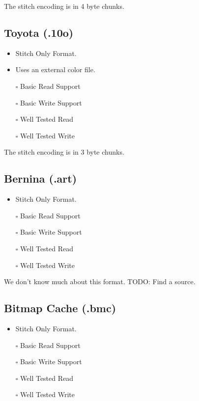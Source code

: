 \documentclass[onesize, a4paper]{refart}
\providecommand{\tightlist}{\setlength{\itemsep}{0pt}\setlength{\parskip}{0pt}}
\begin{document}
The stitch encoding is in 4 byte chunks.

\subsection{Toyota (.10o)}

\begin{itemize}
\tightlist
\item Stitch Only Format.
\item Uses an external color file.
\item[$\square$] Basic Read Support
\item[$\square$] Basic Write Support
\item[$\square$] Well Tested Read
\item[$\square$] Well Tested Write
\end{itemize}

The stitch encoding is in 3 byte chunks.

\subsection{Bernina (.art)}

\begin{itemize}
\tightlist
\item Stitch Only Format.
\item[$\square$] Basic Read Support
\item[$\square$] Basic Write Support
\item[$\square$] Well Tested Read
\item[$\square$] Well Tested Write
\end{itemize}

We don't know much about this format. TODO: Find a source.

\subsection{Bitmap Cache (.bmc)}

\begin{itemize}
\tightlist
\item Stitch Only Format.
\item[$\square$] Basic Read Support
\item[$\square$] Basic Write Support
\item[$\square$] Well Tested Read
\item[$\square$] Well Tested Write
\end{itemize}
\end{document}
